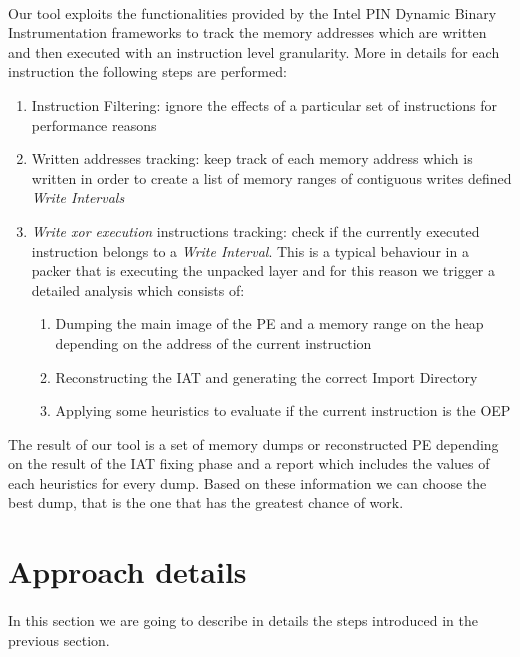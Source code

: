 \paragraph{}
Our tool exploits the functionalities provided by the Intel PIN Dynamic Binary Instrumentation frameworks to track the memory addresses which are written and then executed with an instruction level granularity.
More in details for each instruction the following steps are performed:
\begin{enumerate}
\item Instruction Filtering: ignore the effects of a particular set of instructions for performance reasons
\item Written addresses tracking: keep track of each memory address which is written in order to create a list of memory ranges of contiguous writes defined \textit{Write Intervals} 
\item \textit{Write xor execution} instructions tracking: check if the currently executed instruction belongs to a \textit{Write Interval}. This is a typical behaviour in a packer that is executing the unpacked layer and for this reason we trigger a detailed analysis which consists of:
	\begin{enumerate}
	\item Dumping the main image of the PE and a memory range on the heap depending on the address of the current instruction
	\item Reconstructing the IAT and generating the correct Import Directory
	\item Applying some heuristics to evaluate if the current instruction is the OEP
	\end{enumerate}
\end{enumerate}
The result of our tool is a set of memory dumps or reconstructed PE depending on the result of the IAT fixing phase and a report which includes the values of each heuristics for every dump. Based on these information we can choose the best dump, that is the one that has the greatest chance of work.

\section{Approach details}
\paragraph{}
In this section we are going to describe in details the steps introduced in the previous section.
